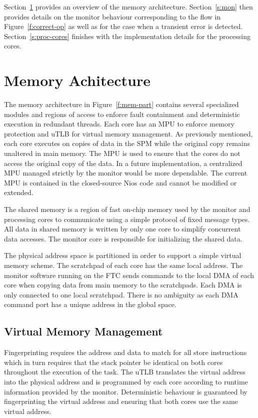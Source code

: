 
	Section~\ref{s:mem-arch} provides an overview of the memory architecture. 
	Section~\ref{s:mon} then provides details on the monitor behaviour corresponding to the flow in Figure~\ref{f:correct-op} as well as for the case when a transient error is detected.
	Section~\ref{s:proc-cores} finishes with the implementation details for the processing cores.

\section{Memory Achitecture}
\label{s:mem-arch}
	The memory architecture in Figure~\ref{f:mem-part} contains several specialized modules and regions of access to enforce fault containment and deterministic execution in redundant threads. 
	Each core has an MPU to enforce memory protection and uTLB for virtual memory management. 
	As previously mentioned, each core executes on copies of data in the SPM while the original copy remains unaltered in main memory. 
	The MPU is used to ensure that the cores do not access the original copy of the data. 
	In a future implementation, a centralized MPU managed strictly by the monitor would be more dependable. 
	The current MPU is contained in the closed-source Nios code and cannot be modified or extended. 

	The shared memory is a region of fast on-chip memory used by the monitor and processing cores to communicate using a simple protocol of fixed message types. 
	All data in shared memory is written by only one core to simplify concurrent data accesses. 
	The monitor core is responsible for initializing the shared data. %

	The physical address space is partitioned in order to support a simple virtual memory scheme. 
	The scratchpad of each core has the same local address. 
	The monitor software running on the FTC sends commands to the local DMA of each core when copying data from main memory to the scratchpads. 
	Each DMA is only connected to one local scratchpad. 
	There is no ambiguity as each DMA command port has a unique address in the global space. 

\subsection{Virtual Memory Management}
\label{s:virt-mem}
	Fingerprinting requires the address and data to match for all store instructions which in turn requires that the stack pointer be identical on both cores throughout the execution of the task. 
	The uTLB translates the virtual address into the physical address and is programmed by each core according to runtime information provided by the monitor. 		
	Deterministic behaviour is guaranteed by fingerprinting the virtual address and ensuring that both cores use the same virtual address. 

